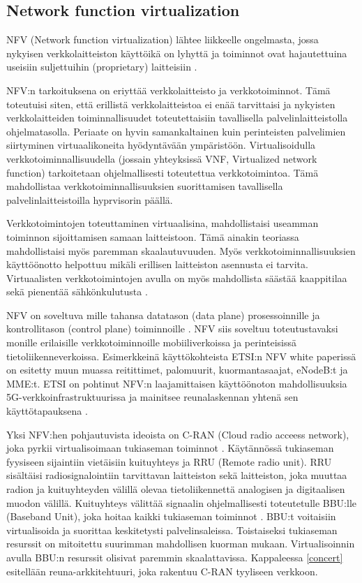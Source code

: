 \subsection{Network function virtualization} \label{nfv}
NFV (Network function virtualization) lähtee liikkeelle ongelmasta, jossa nykyisen verkkolaitteiston käyttöikä on lyhyttä ja toiminnot ovat hajautettuina useisiin suljettuihin (proprietary) laitteisiin \cite{nfvwhite}. 

NFV:n tarkoituksena on eriyttää verkkolaitteisto ja verkkotoiminnot. Tämä toteutuisi siten, että erillistä verkkolaitteistoa ei enää tarvittaisi ja nykyisten verkkolaitteiden toiminnallisuudet toteutettaisiin tavallisella palvelinlaitteistolla ohjelmatasolla. Periaate on hyvin samankaltainen kuin perinteisten palvelimien siirtyminen virtuaalikoneita hyödyntävään ympäristöön.
Virtualisoidulla verkkotoiminnallisuudella (jossain yhteyksissä VNF, Virtualized network function) tarkoitetaan ohjelmallisesti toteutettua verkkotoimintoa. Tämä mahdollistaa verkkotoiminnallisuuksien suorittamisen tavallisella palvelinlaitteistoilla hyprvisorin päällä. 

Verkkotoimintojen toteuttaminen virtuaalisina, mahdollistaisi useamman toiminnon sijoittamisen samaan laitteistoon. Tämä ainakin teoriassa mahdollistaisi myös paremman skaalautuvuuden. Myös verkkotoiminnallisuuksien käyttöönotto helpottuu mikäli erillisen laitteiston asennusta ei tarvita. Virtuaalisten verkkotoimintojen avulla on myös mahdollista säästää kaappitilaa sekä pienentää sähkönkulutusta \cite{nfvedge}.

NFV on soveltuva mille tahansa datatason (data plane) prosessoinnille ja kontrollitason (control plane) toiminnoille \cite{nfvwhite}. NFV siis soveltuu toteutustavaksi monille erilaisille verkkotoiminnoille mobiiliverkoissa ja perinteisissä tietoliikenneverkoissa. Esimerkkeinä käyttökohteista ETSI:n NFV white paperissä on esitetty muun muassa reitittimet, palomuurit, kuormantasaajat, eNodeB:t ja MME:t. ETSI on pohtinut NFV:n laajamittaisen käyttöönoton mahdollisuuksia 5G-verkkoinfrastruktuurissa ja mainitsee reunalaskennan yhtenä sen käyttötapauksena \cite{etsinfv5g}.

Yksi NFV:hen pohjautuvista ideoista on C-RAN (Cloud radio acceess network), joka pyrkii virtualisoimaan tukiaseman toiminnot \cite{chih2014recent}. Käytännössä tukiaseman fyysiseen sijaintiin vietäisiin kuituyhteys ja RRU (Remote radio unit).
RRU sisältäisi radiosignalointiin tarvittavan laitteiston sekä laitteiston, joka muuttaa radion ja kuituyhteyden välillä olevaa tietoliikennettä analogisen ja digitaalisen muodon välillä.
Kuituyhteys välittää signaalin ohjelmallisesti toteutetulle BBU:lle (Baseband Unit), joka hoitaa kaikki tukiaseman toiminnot \cite{chih2014recent}.
BBU:t voitaisiin virtualisoida ja suorittaa keskitetysti palvelinsaleissa.
Toistaiseksi tukiaseman resurssit on mitoitettu suurimman mahdollisen kuorman mukaan. Virtualisoinnin avulla BBU:n resurssit olisivat paremmin skaalattavissa.
Kappaleessa \ref{concert} esitellään reuna-arkkitehtuuri, joka rakentuu C-RAN tyyliseen verkkoon.

